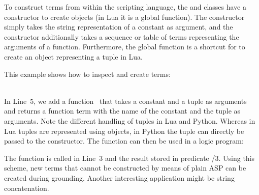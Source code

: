 To construct terms from within the scripting language,
the  and  classes have a constructor to create objects (in Lua it is a global function).
The  constructor simply takes the string representation of a constant as argument,
and the  constructor additionally takes a sequence or table of terms representing the arguments of a function.
Furthermore,
the global function  is a shortcut for  to create an object representing a tuple in Lua.

\begin{example}
This example shows how to inspect and create terms:
%
\\[-8pt] %
\begin{minipage}[t]{0.5\textwidth}

\end{minipage}
\begin{minipage}[t]{0.5\textwidth}

\end{minipage}\\
In Line~5, we add a function~
that  takes a constant and a tuple as arguments
and returns a function term with the name of the constant and the tuple as arguments.
Note the different handling of tuples in Lua and Python.
Whereas in Lua tuples are represented using  objects,
in Python the tuple can directly be passed to the  constructor.
The  function can then be used in a logic program:%
%

%
The function is called in Line~3 and the result stored in predicate /$3$.
Using this scheme,
new terms
that cannot be constructed by means of plain ASP
can be created during grounding.
Another interesting application might be string concatenation.
\end{example}

